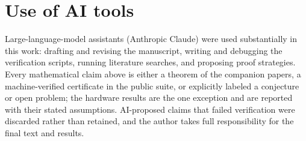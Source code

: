 \documentclass[11pt]{article}
\theoremstyle{definition}
\theoremstyle{remark}
\begin{document}
\section*{Use of AI tools}
Large-language-model assistants (Anthropic Claude) were used substantially in this
work: drafting and revising the manuscript, writing and debugging the verification
scripts, running literature searches, and proposing proof strategies. Every mathematical
claim above is either a theorem of the companion papers, a machine-verified certificate in
the public suite, or explicitly labeled a conjecture or open problem; the hardware results
are the one exception and are reported with their stated assumptions. AI-proposed
claims that failed verification were discarded rather than retained, and the author
takes full responsibility for the final text and results.


\appendix
\end{document}
